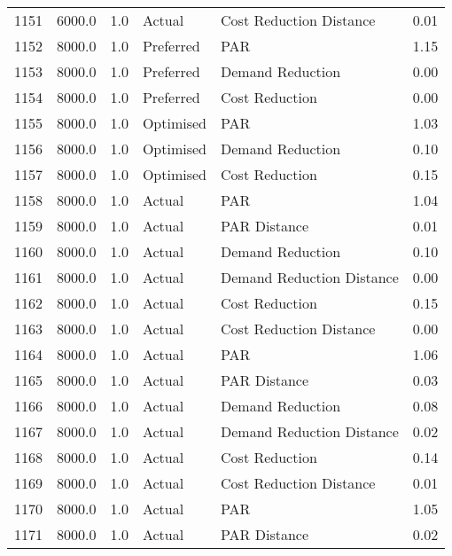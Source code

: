 \begin{longtable}{lrrllr}
1151 &       6000.0 &     1.0 &         Actual &    Cost Reduction Distance &   0.01 \\
1152 &       8000.0 &     1.0 &      Preferred &                        PAR &   1.15 \\
1153 &       8000.0 &     1.0 &      Preferred &           Demand Reduction &   0.00 \\
1154 &       8000.0 &     1.0 &      Preferred &             Cost Reduction &   0.00 \\
1155 &       8000.0 &     1.0 &      Optimised &                        PAR &   1.03 \\
1156 &       8000.0 &     1.0 &      Optimised &           Demand Reduction &   0.10 \\
1157 &       8000.0 &     1.0 &      Optimised &             Cost Reduction &   0.15 \\
1158 &       8000.0 &     1.0 &         Actual &                        PAR &   1.04 \\
1159 &       8000.0 &     1.0 &         Actual &               PAR Distance &   0.01 \\
1160 &       8000.0 &     1.0 &         Actual &           Demand Reduction &   0.10 \\
1161 &       8000.0 &     1.0 &         Actual &  Demand Reduction Distance &   0.00 \\
1162 &       8000.0 &     1.0 &         Actual &             Cost Reduction &   0.15 \\
1163 &       8000.0 &     1.0 &         Actual &    Cost Reduction Distance &   0.00 \\
1164 &       8000.0 &     1.0 &         Actual &                        PAR &   1.06 \\
1165 &       8000.0 &     1.0 &         Actual &               PAR Distance &   0.03 \\
1166 &       8000.0 &     1.0 &         Actual &           Demand Reduction &   0.08 \\
1167 &       8000.0 &     1.0 &         Actual &  Demand Reduction Distance &   0.02 \\
1168 &       8000.0 &     1.0 &         Actual &             Cost Reduction &   0.14 \\
1169 &       8000.0 &     1.0 &         Actual &    Cost Reduction Distance &   0.01 \\
1170 &       8000.0 &     1.0 &         Actual &                        PAR &   1.05 \\
1171 &       8000.0 &     1.0 &         Actual &               PAR Distance &   0.02 \\

\end{longtable}
